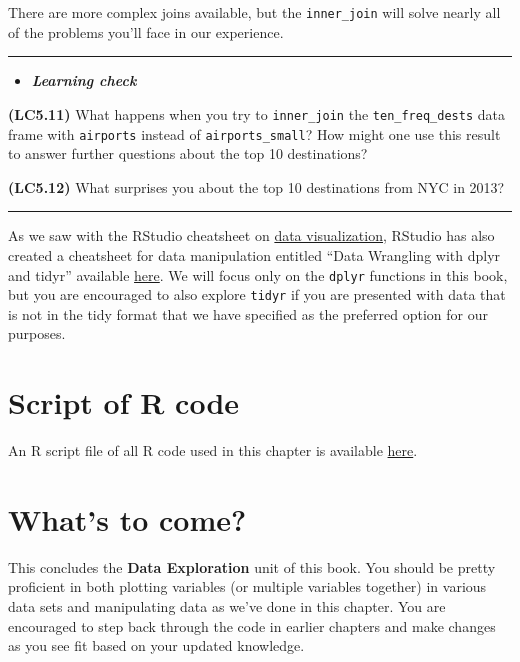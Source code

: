 \documentclass[]{tufte-book}
\let\oldrule=\rule
\renewcommand{\rule}[1]{\oldrule{\linewidth}}
\newenvironment{rmdblock}[1]
  {\begin{shaded*}
  \begin{itemize}
  \renewcommand{\labelitemi}{
    \raisebox{-.7\height}[0pt][0pt]{
    }
  }
  \item
  }
  {
  \end{itemize}
  \end{shaded*}
  }
\newenvironment{learncheck}
  {\begin{rmdblock}{warning}}
  {\end{rmdblock}}
\begin{document}
There are more complex joins available, but the \texttt{inner\_join}
will solve nearly all of the problems you'll face in our experience.

\begin{center}\rule{0.5\linewidth}{\linethickness}\end{center}

\begin{learncheck}
\textbf{\emph{Learning check}}
\end{learncheck}

\textbf{(LC5.11)} What happens when you try to \texttt{inner\_join} the
\texttt{ten\_freq\_dests} data frame with \texttt{airports} instead of
\texttt{airports\_small}? How might one use this result to answer
further questions about the top 10 destinations?

\textbf{(LC5.12)} What surprises you about the top 10 destinations from
NYC in 2013?

\begin{center}\rule{0.5\linewidth}{\linethickness}\end{center}

As we saw with the RStudio cheatsheet on
\href{https://www.rstudio.com/wp-content/uploads/2015/12/ggplot2-cheatsheet-2.0.pdf}{data
visualization}, RStudio has also created a cheatsheet for data
manipulation entitled ``Data Wrangling with dplyr and tidyr'' available
\href{https://www.rstudio.com/wp-content/uploads/2015/02/data-wrangling-cheatsheet.pdf}{here}.
We will focus only on the \texttt{dplyr} functions in this book, but you
are encouraged to also explore \texttt{tidyr} if you are presented with
data that is not in the tidy format that we have specified as the
preferred option for our purposes.

\section{Script of R code}\label{script-of-r-code-1}

An R script file of all R code used in this chapter is available
\href{http://ismayc.github.io/moderndiver-book/05-manip.R}{here}.

\section{What's to come?}\label{whats-to-come-2}

This concludes the \textbf{Data Exploration} unit of this book. You
should be pretty proficient in both plotting variables (or multiple
variables together) in various data sets and manipulating data as we've
done in this chapter. You are encouraged to step back through the code
in earlier chapters and make changes as you see fit based on your
updated knowledge.
\end{document}
